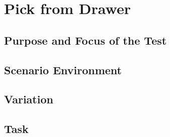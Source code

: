 \newpage
\section{Pick from Drawer}


\subsection{Purpose and Focus of the Test}



\subsection{Scenario Environment}



\subsection{Variation}


\subsection{Task}
